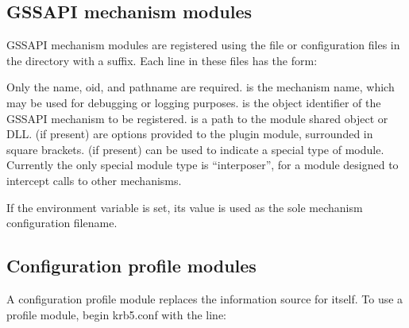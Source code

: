 \documentclass[letterpaper,10pt,english]{sphinxmanual}
\begin{document}
\subsection{GSSAPI mechanism modules}
\label{\detokenize{admin/host_config:gssapi-plugin-config}}\label{\detokenize{admin/host_config:gssapi-mechanism-modules}}
GSSAPI mechanism modules are registered using the file
{\hyperref[\detokenize{mitK5defaults:paths}]{}} or configuration files in the
{\hyperref[\detokenize{mitK5defaults:paths}]{}} directory with a 
suffix.  Each line in these files has the form:

%
\begin{sphinxVerbatim}[commandchars=\\\{\}]
      \PYG{p}{[}\PYG{p}{]}  
\end{sphinxVerbatim}

Only the name, oid, and pathname are required.   is the
mechanism name, which may be used for debugging or logging purposes.
 is the object identifier of the GSSAPI mechanism to be
registered.   is a path to the module shared object or DLL.
 (if present) are options provided to the plugin module,
surrounded in square brackets.   (if present) can be used to
indicate a special type of module.  Currently the only special module
type is “interposer”, for a module designed to intercept calls to
other mechanisms.

If the environment variable  is set, its value is
used as the sole mechanism configuration filename.


\subsection{Configuration profile modules}
\label{\detokenize{admin/host_config:profile-plugin-config}}\label{\detokenize{admin/host_config:configuration-profile-modules}}
A configuration profile module replaces the information source for
{\hyperref[\detokenize{admin/conf_files/krb5_conf:krb5-conf-5}]{}} itself.  To use a profile module, begin krb5.conf
with the line:
\end{document}
